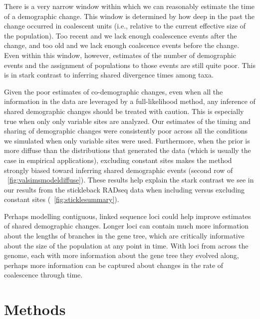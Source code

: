 There is a very narrow window within which we can reasonably estimate the time
of a demographic change.
This window is determined by how deep in the past the change occurred
in coalescent units (i.e., relative to the current effective size
of the population).
Too recent and we lack enough coalescence events after the change, and too old
and we lack enough coalscence events before the change.
Even within this window, however, estimates of the number of demographic events
and the assignment of populations to those events are still quite poor.
This is in stark contrast to inferring shared divergence times among taxa.

Given the poor estimates of co-demographic changes, even when all
the information in the data are leveraged by a full-likelihood method, any
inference of shared demographic changes should be treated with caution.
This is especially true when only only variable sites are analyzed.
Our estimates of the timing and sharing of demographic changes were
consistently poor across all the conditions we simulated when only variable
sites were used.
Furthermore, when the prior is more diffuse than the distributions that
generated the data (which is usually the case in empirical applications),
excluding constant sites makes the method strongly biased toward
inferring shared demographic events
(second row of \fig{}~\ref{fig:valsimsmodeldiffuse}).
These results help explain the stark contrast we see in our results from the
stickleback RADseq data when including versus excluding constant sites
(\fig{}~\ref{fig:sticklesummary}).

Perhaps modelling contiguous, linked sequence loci could help
improve estimates of shared demographic changes.
Longer loci can contain much more information about the lengths of branches in
the gene tree, which are critically informative about the size of the
population at any point in time.
With loci from across the genome, each with more information about the gene
tree they evolved along,
perhaps more information can be captured about changes in the rate of
coalescence through time.


\section{Methods}


